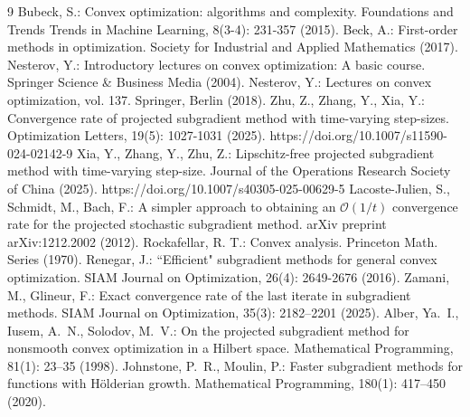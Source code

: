 \documentclass[sn-mathphys]{JORSC-jnl}%
\theoremstyle{thmstyleone}%
\theoremstyle{thmstylethree}%
\begin{document}
\begin{thebibliography}{9}
	Bubeck, S.: Convex optimization: algorithms and complexity. Foundations
	and Trends Trends{\textregistered} in Machine Learning, 8(3-4): 231-357 (2015).
	Beck, A.: First-order methods in optimization. Society for Industrial and Applied Mathematics (2017).
	Nesterov, Y.: Introductory lectures on convex optimization: A basic course. Springer Science \& Business Media (2004).
	Nesterov, Y.: Lectures on convex optimization, vol. 137. Springer, Berlin (2018).
	Zhu, Z., Zhang, Y., Xia, Y.: Convergence rate of projected subgradient method
	with time-varying step-sizes. Optimization Letters, 19(5): 1027-1031 (2025). https://doi.org/10.1007/s11590-024-02142-9
	Xia, Y., Zhang, Y., Zhu, Z.: Lipschitz-free projected subgradient method
	with time-varying step-size. Journal of the Operations Research Society of China (2025). https://doi.org/10.1007/s40305-025-00629-5
	Lacoste-Julien, S., Schmidt, M., Bach, F.: A simpler approach to obtaining an $\mathcal{O}(1/t)$ convergence rate for the projected stochastic subgradient method. arXiv preprint arXiv:1212.2002 (2012).
	Rockafellar, R. T.: Convex analysis. Princeton Math. Series (1970).
	Renegar, J.: ``Efficient" subgradient methods for general convex optimization. SIAM Journal on Optimization, 26(4): 2649-2676 (2016).
	Zamani, M., Glineur, F.: Exact convergence rate of the last iterate in subgradient methods. 
	SIAM Journal on Optimization, 35(3): 2182--2201 (2025).
	Alber, Ya.~I., Iusem, A.~N., Solodov, M.~V.: On the projected subgradient method for nonsmooth convex optimization in a Hilbert space. 
	Mathematical Programming, 81(1): 23--35 (1998).
	Johnstone, P.~R., Moulin, P.: Faster subgradient methods for functions with H{\"o}lderian growth. 
	Mathematical Programming, 180(1): 417--450 (2020).
\end{thebibliography}
\end{document}
